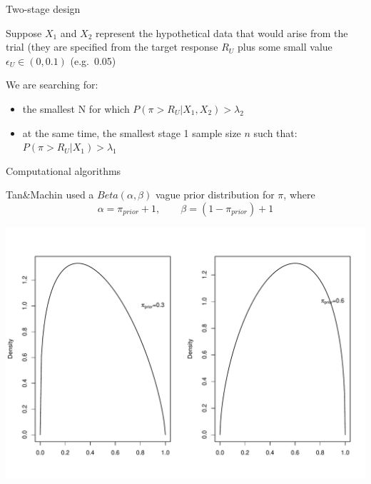 \documentclass{beamer}
\begin{document}
\begin{frame}{Two-stage design}

Suppose \(X_1\) and \(X_2\) represent the hypothetical data that would
arise from the trial (they are specified from the target response
\(R_U\) plus some small value \(\epsilon_U\in(0,0.1)\) (e.g.~0.05)

We are searching for:

\begin{itemize}
\itemsep1pt\parskip0pt
\item
  the smallest N for which \(P(\pi > R_U\vert X_1,X_2)>\lambda_2\)
\item
  at the same time, the smallest stage 1 sample size \(n\) such that:
  \(P(\pi > R_U\vert X_1)>\lambda_1\)
\end{itemize}

\end{frame}

\begin{frame}{Computational algorithms}

Tan\&Machin used a \(Beta(\alpha,\beta)\) vague prior distribution for
\(\pi\), where \[
\alpha = \pi_{prior} +1, \qquad \beta = (1-\pi_{prior})+1
\]

\begin{center}\includegraphics[scale=0.4]{06SingleThresholdDesign_files/figure-beamer/unnamed-chunk-1-1} \end{center}

\end{frame}
\end{document}
